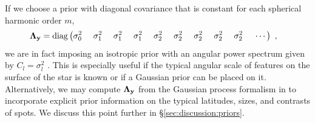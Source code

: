 \documentclass[modern]{aastex631}
\begin{document}
%
If we choose a prior with diagonal covariance that is constant for each spherical harmonic order $m$,
%
\begin{align}
    \boldsymbol{\Lambda}_\bvec{y} & =
    \mathrm{diag} \left(
    \sigma_0^2
    \quad\quad\quad\quad
    \sigma_1^2
    \quad\quad\quad\quad
    \sigma_1^2
    \quad\quad\quad\quad
    \sigma_1^2
    \quad\quad\quad\quad
    \sigma_2^2
    \quad\quad\quad\quad
    \sigma_2^2
    \quad\quad\quad\quad
    \sigma_2^2
    \quad\quad\quad\quad
    \sigma_2^2
    \quad\quad\quad\quad
    \sigma_2^2
    \quad\quad\quad\quad
    \cdots
    \right)
    \quad,
\end{align}
%
we are in fact imposing an isotropic prior with an angular power spectrum given by $C_l = \sigma_l^2$
\citep[e.g.,][]{Baldi2006}. 
This is especially useful if the typical angular scale of features on the surface of the star is known or if a Gaussian prior can be placed on it.
Alternatively, we may compute $\boldsymbol{\Lambda}_{\mathbf{y}}$ from the Gaussian process formalism in \citet{Luger2021b} to incorporate explicit prior information on the typical latitudes, sizes, and contrasts of spots.
We discuss this point further in \S\ref{sec:discussion:priors}.
\end{document}

